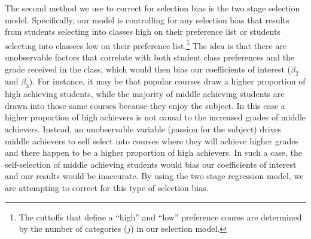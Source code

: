 The second method we use to correct for selection bias is the two stage selection model.
Specifically, our model is controlling for any selection bias that results from students selecting into classes high on their preference list or students selecting into classees low on their preference list.\footnote{The cuttoffs that define a ``high'' and ``low'' preference course are determined by the number of categories ($j$) in our selection model.} 
The idea is that there are unobservable factors that correlate with both student class preferences and the grade received in the class, which would then bias our coefficients of interest ($\beta_{2}$ and $\beta_{3}$). 
For instance, it may be that popular courses draw a higher proportion of high achieving students, while the majority of middle achieving students are drawn into those same courses because they enjoy the subject. 
In this case a higher proportion of high achievers is not causal to the increased grades of middle achievers. 
Instead, an unobservable variable (passion for the subject) drives middle achievers to self select into courses where they will achieve higher grades and there happen to be a higher proportion of high achievers. 
In such a case, the self-selection of middle achieving students would bias our coefficients of interest and our results would be inaccurate.
By using the two stage regression model, we are attempting to correct for this type of selection bias.
